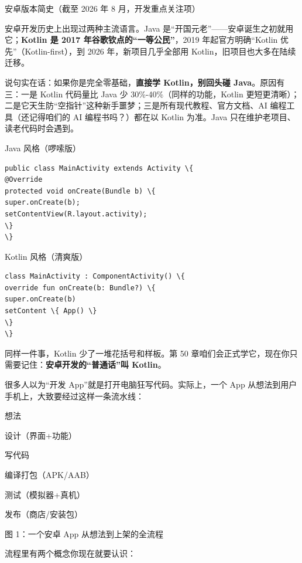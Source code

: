 \begin{center}\small\color{gray}安卓版本简史（截至 2026 年 8 月，开发重点关注项）\end{center}


安卓开发历史上出现过两种主流语言。Java 是“开国元老”——安卓诞生之初就用它；\textbf{Kotlin 是 2017 年谷歌钦点的“一等公民”}，2019 年起官方明确“Kotlin 优先”（Kotlin-first），到 2026 年，新项目几乎全部用 Kotlin，旧项目也大多在陆续迁移。

说句实在话：如果你是完全零基础，\textbf{直接学 Kotlin，别回头碰 Java}。原因有三：一是 Kotlin 代码量比 Java 少 30\%-40\%（同样的功能，Kotlin 更短更清晰）；二是它天生防“空指针”这种新手噩梦；三是所有现代教程、官方文档、AI 编程工具（还记得咱们的 AI 编程书吗？）都在以 Kotlin 为准。Java 只在维护老项目、读老代码时会遇到。

Java 风格（啰嗦版）

\begin{lstlisting}
public class MainActivity extends Activity \{
@Override
protected void onCreate(Bundle b) \{
super.onCreate(b);
setContentView(R.layout.activity);
\}
\}
\end{lstlisting}

Kotlin 风格（清爽版）

\begin{lstlisting}
class MainActivity : ComponentActivity() \{
override fun onCreate(b: Bundle?) \{
super.onCreate(b)
setContent \{ App() \}
\}
\}
\end{lstlisting}

同样一件事，Kotlin 少了一堆花括号和样板。第 50 章咱们会正式学它，现在你只需要记住：\textbf{安卓开发的“普通话”叫 Kotlin}。


很多人以为“开发 App”就是打开电脑狂写代码。实际上，一个 App 从想法到用户手机上，大致要经过这样一条流水线：

想法

设计（界面+功能）

写代码

编译打包（APK/AAB）

测试（模拟器+真机）

发布（商店/安装包）

\begin{center}\small\color{gray}图 1：一个安卓 App 从想法到上架的全流程\end{center}

流程里有两个概念你现在就要认识：

